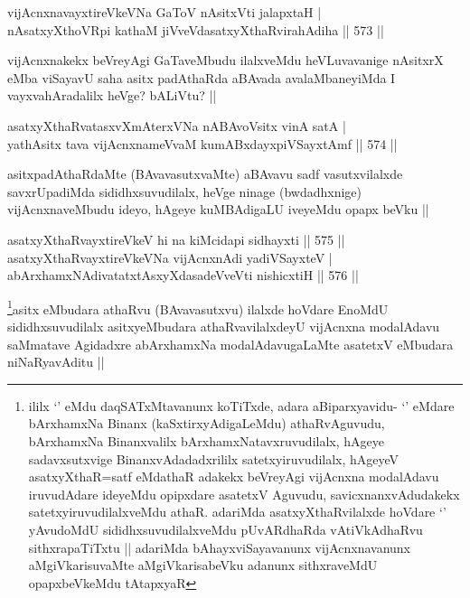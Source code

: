 \begin{shl}
vijAcnxnavayxtireVkeVNa GaToV nAsitxVti jalapxtaH | \\
nAsatxyXthoVR\s pi kathaM jiVveVdasatxyXthaRvirahAdiha \hfill||  573 ||  
\end{shl}

\begin{artha}
vijAcnxnakekx beVreyAgi GaTaveMbudu ilalxveMdu heVLuvavanige nAsitxrX eMba viSayavU saha asitx padAthaRda aBAvada avalaMbaneyiMda I vayxvahAradalilx heVge? bALiVtu? ||
\end{artha}

\begin{shl}
asatxyXthaRvatasxvXmAterxVNa nABAvoV\s sitx vinA satA | \\
yathA\s sitx tava vijAcnxnameVvaM kumABxdayxpiVSayxtAmf \hfill||  574 ||  
\end{shl}

\begin{artha}
asitxpadAthaRdaMte (BAvavasutxvaMte) aBAvavu sadf vasutxvilalxde savxrUpadiMda sididhxsuvudilalx, heVge ninage (bwdadhxnige) vijAcnxnaveMbudu ideyo, hAgeye kuMBAdigaLU iveyeMdu opapx beVku ||
\end{artha}

\begin{shl}
asatxyXthaRvayxtireVkeV hi na kiMcidapi sidhayxti \hfill||  575 ||  \\
asatxyXthaRvayxtireVkeVNa vijAcnxnAdi yadiVSayxteV | \\
abArxhamxNAdivatatxtAsxyXdasadeVveVti nishicxtiH \hfill||  576 ||  
\end{shl}

\begin{artha}
\footnote{ililx `\stext' eMdu daqSATxMtavanunx koTiTxde, adara aBiparxyavidu- `\stext' eMdare bArxhamxNa Binanx (kaSxtirxyAdigaLeMdu) athaRvAguvudu, bArxhamxNa Binanxvalilx bArxhamxNatavxruvudilalx, hAgeye sadavxsutxvige BinanxvAdadadxrililx satetxyiruvudilalx, hAgeyeV asatxyXthaR=satf eMdathaR adakekx beVreyAgi vijAcnxna modalAdavu iruvudAdare ideyeMdu opipxdare asatetxV Aguvudu, savicxnanxvAdudakekx satetxyiruvudilalxveMdu athaR. adariMda asatxyXthaRvilalxde hoVdare `\stext' yAvudoMdU sididhxsuvudilalxveMdu pUvARdhaRda vAtiVkAdhaRvu sithxrapaTiTxtu || adariMda bAhayxviSayavanunx vijAcnxnavanunx aMgiVkarisuvaMte aMgiVkarisabeVku adanunx sithxraveMdU opapxbeVkeMdu tAtapxyaR}asitx eMbudara athaRvu (BAvavasutxvu) ilalxde hoVdare EnoMdU sididhxsuvudilalx asitxyeMbudara athaRvavilalxdeyU vijAcnxna modalAdavu saMmatave Agidadxre abArxhamxNa modalAdavugaLaMte asatetxV eMbudara niNaRyavAditu ||
\end{artha}

